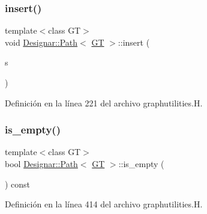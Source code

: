 \subsubsection{\texorpdfstring{insert()}{insert()}\hspace{0.1cm}{\footnotesize\ttfamily [2/2]}}
{\footnotesize\ttfamily template$<$class GT$>$ \\
void \hyperlink{class_designar_1_1_path}{Designar\+::\+Path}$<$ \hyperlink{demo-buildgraph_8_c_a3001c40d2c31ca87ed96cd7d1334a55e}{GT} $>$\+::insert (\begin{DoxyParamCaption}\item[{\hyperlink{class_designar_1_1_path_a7b499fd50e96e3360968d4cfef7a3736}{Node\+Type} \&}]{s }\end{DoxyParamCaption})\hspace{0.3cm}{\ttfamily [inline]}}



Definición en la línea 221 del archivo graphutilities.\+H.

\mbox{\label{class_designar_1_1_path_a80167d17fbc206944b05293253c95df0}} 
\subsubsection{\texorpdfstring{is\+\_\+empty()}{is\_empty()}}
{\footnotesize\ttfamily template$<$class GT$>$ \\
bool \hyperlink{class_designar_1_1_path}{Designar\+::\+Path}$<$ \hyperlink{demo-buildgraph_8_c_a3001c40d2c31ca87ed96cd7d1334a55e}{GT} $>$\+::is\+\_\+empty (\begin{DoxyParamCaption}{ }\end{DoxyParamCaption}) const\hspace{0.3cm}{\ttfamily [inline]}}



Definición en la línea 414 del archivo graphutilities.\+H.

\mbox{\label{class_designar_1_1_path_a9b358572a872b993a4cdad651cc2bf58}} 

